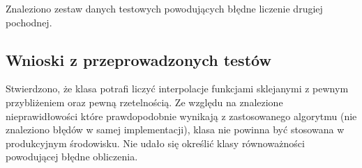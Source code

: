 \documentclass[12pt,a4paper,notitlepage]{article}
\begin{document}
Znaleziono zestaw danych testowych powodujących błędne liczenie drugiej pochodnej.

\subsection{Wnioski z przeprowadzonych testów}

Stwierdzono, że klasa potrafi liczyć interpolacje funkcjami sklejanymi z pewnym przybliżeniem oraz pewną rzetelnością. Ze względu na znalezione nieprawidłowości które prawdopodobnie wynikają z zastosowanego algorytmu (nie znaleziono błędów w samej implementacji), klasa nie powinna być stosowana w produkcyjnym środowisku. Nie udało się określić klasy równoważności powodującej błędne obliczenia.
\end{document}
